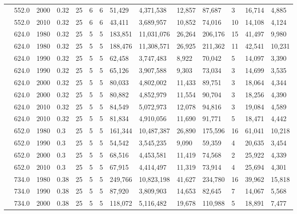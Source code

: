 \begin{table}[]
\begin{tabular}{|l|l|l|l|l|l|l|l|l|l|l|l|l|l|}
		& 552.0 & 2000 & 0.32 & 25 & 6 & 6 & 51,429 & 4,371,538 & 12,857 & 87,687 & 3 & 16,714 & 4,885 \\ \cline{2-14} 
		& 552.0 & 2010 & 0.32 & 25 & 6 & 6 & 43,411 & 3,689,957 & 10,852 & 74,016 & 10 & 14,108 & 4,124 \\ \cline{2-14} 
		& 624.0 & 1980 & 0.32 & 25 & 5 & 5 & 183,851 & 11,031,076 & 26,264 & 206,176 & 15 & 41,497 & 9,980 \\ \cline{2-14} 
		& 624.0 & 1980 & 0.32 & 25 & 5 & 5 & 188,476 & 11,308,571 & 26,925 & 211,362 & 11 & 42,541 & 10,231 \\ \cline{2-14} 
		& 624.0 & 1990 & 0.32 & 25 & 5 & 5 & 62,458 & 3,747,483 & 8,922 & 70,042 & 5 & 14,097 & 3,390 \\ \cline{2-14} 
		& 624.0 & 1990 & 0.32 & 25 & 5 & 5 & 65,126 & 3,907,588 & 9,303 & 73,034 & 3 & 14,699 & 3,535 \\ \cline{2-14} 
		& 624.0 & 2000 & 0.32 & 25 & 5 & 5 & 80,033 & 4,802,002 & 11,433 & 89,751 & 3 & 18,064 & 4,344 \\ \cline{2-14} 
		& 624.0 & 2000 & 0.32 & 25 & 5 & 5 & 80,882 & 4,852,979 & 11,554 & 90,704 & 3 & 18,256 & 4,390 \\ \cline{2-14} 
		& 624.0 & 2010 & 0.32 & 25 & 5 & 5 & 84,549 & 5,072,973 & 12,078 & 94,816 & 3 & 19,084 & 4,589 \\ \cline{2-14} 
		& 624.0 & 2010 & 0.32 & 25 & 5 & 5 & 81,834 & 4,910,056 & 11,690 & 91,771 & 5 & 18,471 & 4,442 \\ \cline{2-14} 
		& 652.0 & 1980 & 0.3 & 25 & 5 & 5 & 161,344 & 10,487,387 & 26,890 & 175,596 & 16 & 61,041 & 10,218 \\ \cline{2-14} 
		& 652.0 & 1990 & 0.3 & 25 & 5 & 5 & 54,542 & 3,545,235 & 9,090 & 59,359 & 4 & 20,635 & 3,454 \\ \cline{2-14} 
		& 652.0 & 2000 & 0.3 & 25 & 5 & 5 & 68,516 & 4,453,581 & 11,419 & 74,568 & 2 & 25,922 & 4,339 \\ \cline{2-14} 
		& 652.0 & 2010 & 0.3 & 25 & 5 & 5 & 67,915 & 4,414,497 & 11,319 & 73,914 & 4 & 25,694 & 4,301 \\ \cline{2-14} 
		& 734.0 & 1980 & 0.38 & 25 & 5 & 5 & 249,766 & 10,823,198 & 41,627 & 234,780 & 16 & 39,962 & 15,818 \\ \cline{2-14} 
		& 734.0 & 1990 & 0.38 & 25 & 5 & 5 & 87,920 & 3,809,903 & 14,653 & 82,645 & 7 & 14,067 & 5,568 \\ \cline{2-14} 
		& 734.0 & 2000 & 0.38 & 25 & 5 & 5 & 118,072 & 5,116,482 & 19,678 & 110,988 & 5 & 18,891 & 7,477 \\ \cline{2-14} 

\end{tabular}
\end{table}
